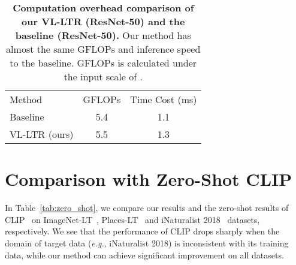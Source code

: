 \documentclass[runningheads]{llncs}
\def\eg{\emph{e.g.}}
\newlength\savedwidth
\newcommand\whline{\noalign{\global\savedwidth\arrayrulewidth\global\arrayrulewidth 0.8pt}\hline\noalign{\global\arrayrulewidth\savedwidth}}
\begin{document}
\begin{table}[h]
\centering
\setlength{\tabcolsep}{3mm}
    \caption{\textbf{Computation overhead comparison of our VL-LTR (ResNet-50) and the baseline (ResNet-50).} Our method has almost the same GFLOPs and inference speed to the baseline. GFLOPs is calculated under the input scale of .}
\begin{tabular}{l|c|c}
    \renewcommand{\arraystretch}{0.1}
	Method & GFLOPs & Time Cost (ms) \\
	\whline
	Baseline & 5.4 & 1.1 \\
	\rowcolor{mygray}
	VL-LTR (ours) & 5.5 & 1.3 \\
	
\end{tabular} \label{tab:speed}
\end{table}

\section{Comparison with Zero-Shot CLIP}

In Table~\ref{tab:zero_shot}, we compare our results and the zero-shot results of CLIP~\cite{clip} on ImageNet-LT~\cite{liu2019large}, Places-LT~\cite{liu2019large} and iNaturalist 2018~\cite{van2018inaturalist} datasets, respectively. We see that the performance of CLIP drops sharply when the domain of target data (\eg, iNaturalist 2018) is inconsistent with its training data,
while our method can achieve significant improvement on all datasets.
\end{document}
